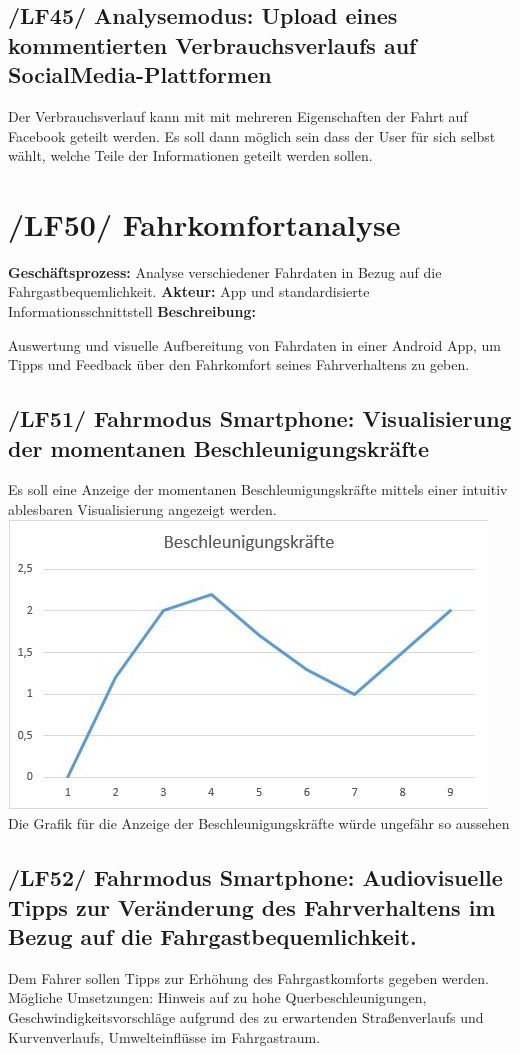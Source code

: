 \subsection{/LF45/ Analysemodus: Upload eines kommentierten Verbrauchsverlaufs auf SocialMedia-Plattformen }
Der Verbrauchsverlauf kann mit mit mehreren Eigenschaften der Fahrt auf Facebook geteilt werden. 
Es soll dann möglich sein dass der User für sich selbst wählt, welche Teile der Informationen geteilt werden sollen.
\newpage

\section{/LF50/ Fahrkomfortanalyse}
\textbf{Geschäftsprozess:}	Analyse verschiedener Fahrdaten in Bezug auf die Fahrgastbequemlichkeit.
\textbf{Akteur:}			App und standardisierte Informationsschnittstell
\textbf{Beschreibung:}	

Auswertung und visuelle Aufbereitung von Fahrdaten in einer Android App, um Tipps und Feedback über den Fahrkomfort seines Fahrverhaltens zu geben.

\subsection{/LF51/ Fahrmodus Smartphone: Visualisierung der momentanen Beschleunigungskräfte}
\nextline
Es soll eine Anzeige der momentanen Beschleunigungskräfte mittels einer intuitiv ablesbaren Visualisierung angezeigt werden.
\nextline
\includegraphics{images/LF51_Beschleunigung.jpg}
\nextline
Die Grafik für die Anzeige der Beschleunigungskräfte würde ungefähr so aussehen

\newpage
\subsection{/LF52/ Fahrmodus Smartphone: Audiovisuelle Tipps zur Veränderung des Fahrverhaltens im Bezug auf die Fahrgastbequemlichkeit.}
\nextline
Dem Fahrer sollen Tipps zur Erhöhung des Fahrgastkomforts gegeben werden. Mögliche Umsetzungen: Hinweis auf zu hohe Querbeschleunigungen, Geschwindigkeitsvorschläge aufgrund des zu erwartenden Straßenverlaufs und Kurvenverlaufs, Umwelteinflüsse im Fahrgastraum.
\nextline
